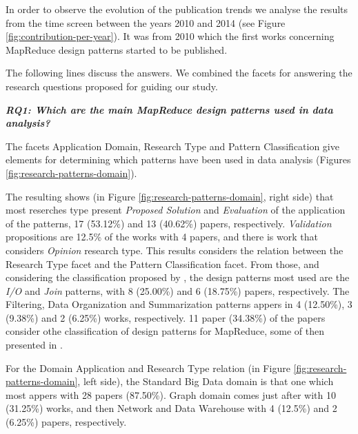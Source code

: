 In order to observe the evolution of the publication trends we analyse the
results from the time screen between the years 2010 and 2014 (see Figure
\ref{fig:contribution-per-year}). It was from 2010 which the first works
concerning MapReduce design patterns started to be published.  


The following lines discuss the answers. We combined the facets for answering
the research questions proposed for guiding our study. 

\bigskip
\textbf{\textit{RQ1: Which are the main MapReduce design patterns used in data
analysis?}} 
    
The facets Application Domain, Research Type and Pattern Classification give
elements for determining which patterns have been used in data analysis (Figures
\ref{fig:research-patterns-domain}). 

The resulting shows (in Figure \ref{fig:research-patterns-domain}, right side)
that most reserches type present \textit{Proposed Solution} and
\textit{Evaluation} of the application of the patterns, 17 (53.12\%) and 13
(40.62\%) papers, respectively. \textit{Validation} propositions are 12.5\% of
the works with 4 papers, and there is work that considers \textit{Opinion}
research type. This results considers the relation between the Research Type
facet and the Pattern Classification facet. From those, and considering the
classification proposed by \cite{White:2012}, the design patterns most used are
the \textit{I/O} and \textit{Join} patterns, with 8 (25.00\%) and 6 (18.75\%)
papers, respectively.  The Filtering, Data Organization and Summarization
patterns appers in 4 (12.50\%), 3 (9.38\%) and 2 (6.25\%) works,
respectively. 11 paper (34.38\%) of the papers consider othe classification of
design patterns for MapReduce, some of then presented in \cite{pig-designpattern:2014}.
 
For the Domain Application and Research Type relation (in Figure
\ref{fig:research-patterns-domain}, left side), the Standard Big Data domain is
that one which most appers with 28 papers (87.50\%). Graph domain comes just
after with 10 (31.25\%) works, and then Network and Data Warehouse with 4
(12.5\%) and 2 (6.25\%) papers, respectively.  

